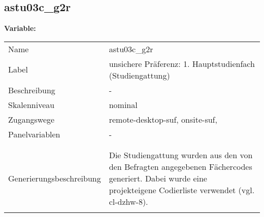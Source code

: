 	
	
	\subsection{astu03c\_g2r}
	\label{subSection:astu03c_g2r}

	\noindent\textbf{Variable:}\\
		\begin{tabular}{lL{11.3cm}}
			\label{tableVariable:astu03c_g2r}
			Name & astu03c\_g2r \\
			Label & unsichere Präferenz: 1. Hauptstudienfach  (Studiengattung) \\
			Beschreibung & - \\
			Skalenniveau & nominal \\
			Zugangswege &
				remote-desktop-suf,
				onsite-suf,
 \\
			Panelvariablen & -
			 \\
			 \\
 \\
					Generierungsbeschreibung & Die Studiengattung wurden aus den von den Befragten angegebenen Fächercodes generiert.  Dabei wurde eine projekteigene Codierliste verwendet (vgl. cl-dzhw-8).
				 \\	
			 \\
		\end{tabular}






